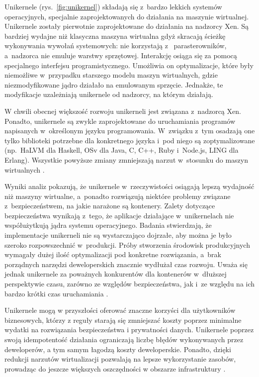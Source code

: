 Unikernele (rys.~\ref{fig:unikernel}) składają się z~bardzo lekkich systemów operacyjnych, specjalnie zaprojektowanych do działania na maszynie wirtualnej. Unikernele zostały pierwotnie zaprojektowane do działania na nadzorcy Xen. Są bardziej wydajne niż klasyczna maszyna wirtualna gdyż skracają ścieżkę wykonywania wywołań systemowych: nie korzystają z~ parasterowników, a~nadzorca nie emuluje warstwy sprzętowej. Interakcję osiąga się za pomocą specjalnego interfejsu programistycznego. Umożliwia on optymalizacje, które były niemożliwe w~przypadku starszego modelu maszyn wirtualnych, gdzie niezmodyfikowane jądro działało na emulowanym sprzęcie. Jednakże, te modyfikacje uzależniają unikernele od nadzorcy, na którym działają.

W chwili obecnej większość rozwoju unikerneli jest związana z~nadzorcą Xen. Ponadto, unikernele są zwykle zaprojektowane do uruchamiania programów napisanych w~określonym języku programowania. W~związku z~tym osadzają one tylko biblioteki potrzebne dla konkretnego języka i~pod niego są zoptymalizowane (np.~HaLVM dla Haskell, OSv dla Java, C, C++, Ruby i~Node.js, LING dla Erlang). Wszystkie powyższe zmiany zmniejszają narzut w~stosunku do maszyn wirtualnych \cite{XenWiki}.

Wyniki analiz pokazują, że unikernele w~rzeczywistości osiągają lepszą wydajność niż maszyny wirtualne, a~ponadto rozwiązują niektóre problemy związane z~bezpieczeństwem, na jakie narażone są kontenery. Zalety dotyczące bezpieczeństwa wynikają z~tego, że aplikacje działające w~unikernelach nie współużytkują jądra systemu operacyjnego. Badania stwierdzają, że implementacje unikerneli nie są wystarczająco dojrzałe, aby można je było szeroko rozpowszechnić w~produkcji. Próby stworzenia środowisk produkcyjnych wymagały dużej ilość optymalizacji pod konkretne rozwiązania, a~brak porządnych narzędzi deweloperskich znacznie wydłużał czas rozwoju. Uważa się jednak unikernele za poważnych konkurentów dla kontenerów w~dłuższej perspektywie czasu, zarówno ze względów bezpieczeństwa, jak i~ze względu na ich bardzo krótki czas uruchamiania \cite{KuenzerUnikernelsEverywhere}\cite{MadhavapeddyUnikernels}.

Unikernele mogą w przyszłości oferować znaczne korzyści dla użytkowników biznesowych, którzy z reguły starają się zmniejszać koszty poprzez minimalne wydatki na rozwiązania bezpieczeństwa i prywatności danych. Unikernele poprzez swoją idempotentość działania ograniczają liczbę błędów wykonywanych przez deweloperów, a tym samym łagodzą koszty deweloperskie. Ponadto, dzięki redukcji narzutów wirtualizacji pozwalają na lepsze wykorzystanie zasobów, prowadząc do jeszcze większych oszczędności w obszarze infrastruktury \cite{DuncanCloudCyberSecurity}.

